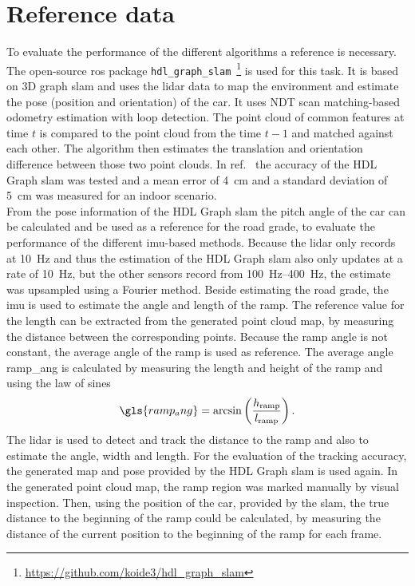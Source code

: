 \section{Reference data}
To evaluate the performance of the different algorithms a reference is necessary.
The open-source \gls{ros} package \texttt{hdl\_graph\_slam}~\footnote{\url{https://github.com/koide3/hdl_graph_slam}} is used for this task.
It is based on 3D graph \gls{slam} and uses the \gls{lidar} data to map the environment and estimate the pose (position and orientation) of the car.
It uses NDT scan matching-based odometry estimation with loop detection.
The point cloud of common features at time $t$ is compared to the point cloud from the time $t-1$ and matched against each other.
The algorithm then estimates the translation and orientation difference between those two point clouds.
In ref.~\cite{Akpnar2021} the accuracy of the HDL Graph \gls{slam} was tested and a mean error of \SI{4}{\cm} and a standard deviation of \SI{5}{\cm} was measured for an indoor scenario.\\
From the pose information of the HDL Graph \gls{slam} the pitch angle of the car can be calculated and be used as a reference for the road grade, to evaluate the performance of the different \gls{imu}-based methods.
Because the \gls{lidar} only records at \SI{10}{\hertz} and thus the estimation of the HDL Graph \gls{slam} also only updates at a rate of \SI{10}{\hertz}, but the other sensors record from \SIrange{100}{400}{\hertz}, the estimate was upsampled using a Fourier method.
Beside estimating the road grade, the \gls{imu} is used to estimate the angle and length of the ramp.
The reference value for the length can be extracted from the generated point cloud map, by measuring the distance between the corresponding points.
Because the ramp angle is not constant, the average angle of the ramp is used as reference.
The average angle \gls{ramp_ang} is calculated by measuring the length and height of the ramp and using the law of sines
\begin{equation}
	\gls{ramp_ang} = \arcsin\left(\frac{h_\mathrm{ramp}}{l_\mathrm{ramp}}\right).
\end{equation}
The \gls{lidar} is used to detect and track the distance to the ramp and also to estimate the angle, width and length.
For the evaluation of the tracking accuracy, the generated map and pose provided by the HDL Graph \gls{slam} is used again.
In the generated point cloud map, the ramp region was marked manually by visual inspection.
Then, using the position of the car, provided by the \gls{slam}, the true distance to the beginning of the ramp could be calculated, by measuring the distance of the current position to the beginning of the ramp for each frame.\\
